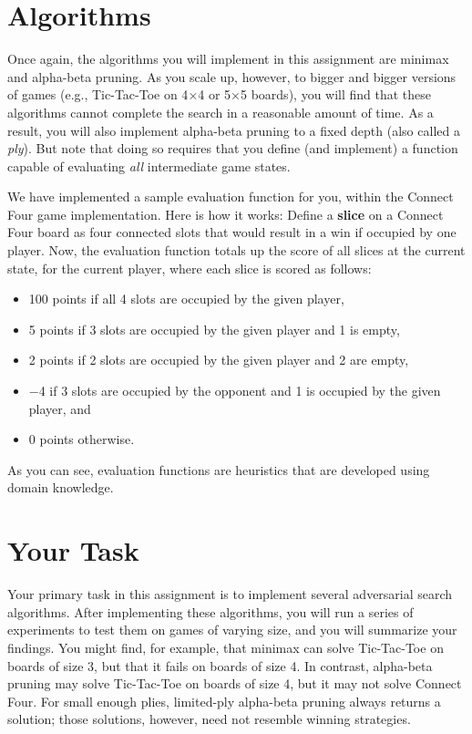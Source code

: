 \documentclass{article}
\begin{document}
\section{Algorithms}
Once again, the algorithms you will implement in this assignment are minimax and alpha-beta pruning.
As you scale up, however, to bigger and bigger versions of games (e.g., Tic-Tac-Toe on 4$\times$4 or
5$\times$5 boards),
you will find that these algorithms cannot complete the search in a reasonable amount of time.
As a result, you will also implement alpha-beta pruning to a fixed depth (also called a \textit{ply}).
But note that doing so requires that you define (and implement) a function
capable of evaluating \emph{all\/} intermediate game states.

We have implemented a sample evaluation function for you, within the Connect Four game implementation.
Here is how it works:
Define a \textbf{slice} on a Connect Four board as
four connected slots that would result in a win if occupied by one player.
Now, the evaluation function totals up the score of all slices at the current state,
for the current player, where each slice is scored as follows:
\begin{itemize}
  \item 100 points if all 4 slots are occupied by the given player,
  \item 5 points if 3 slots are occupied by the given player and 1 is empty,
  \item 2 points if 2 slots are occupied by the given player and 2 are empty,
  \item $-$4 if 3 slots are occupied by the opponent and 1 is occupied by the given player, and
  \item 0 points otherwise.
\end{itemize}
As you can see, evaluation functions are heuristics that are developed using domain knowledge.


\section{Your Task}
Your primary task in this assignment is to implement several adversarial search algorithms.
After implementing these algorithms, you will run a series of experiments to test them on games of varying size,
and you will summarize your findings.
You might find, for example, that minimax can solve Tic-Tac-Toe on boards of size 3,
but that it fails on boards of size 4.
In contrast, alpha-beta pruning may solve Tic-Tac-Toe on boards of size 4,
but it may not solve Connect Four.
For small enough plies, limited-ply alpha-beta pruning always returns a solution;
those solutions, however, need not resemble winning strategies.
\end{document}
